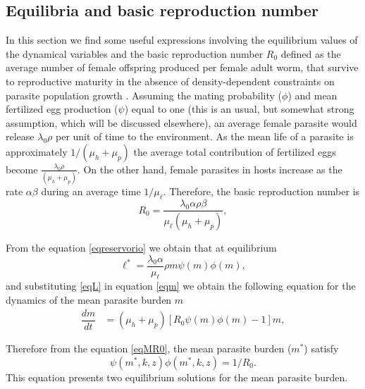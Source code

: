 \documentclass[eng]{MMSB-class-eng}
\begin{document}
{\subsection{Equilibria and basic reproduction number}



{\color{red}
In this section we find some useful expressions involving the equilibrium values of the dynamical variables and the basic reproduction number $R_0$ defined as 
the average number of female offspring produced per female adult worm, that survive to reproductive maturity in the
absence of density-dependent constraints on parasite population growth \citep{anderson1992infectious}. Assuming the mating probability ($\phi$) and mean fertilized egg production ($\psi$) equal to one (this is an usual, but somewhat strong assumption, which will be discussed elsewhere), an average female parasite would release $ \lambda_0  \rho$ per unit of time to the environment. As the mean life of a parasite is approximately $1/(\mu_h+\mu_p)$ the average total contribution of fertilized eggs become $\frac{\lambda_0  \rho}{ (\mu_h + \mu_p)}$. On the other hand, female parasites in hosts increase as the rate $\alpha\beta$ during an average time $1/\mu_{\ell}$. Therefore, the basic reproduction number is \citep{anderson1992infectious,truscott2014modeling,truscott2016soil}
\color{red}
\begin{equation}\label{valorR0}
R_0=\frac{ \lambda_0 \alpha  \rho \beta }{\mu_{\ell} (\mu_h + \mu_p) },
\end{equation}
}

From the equation \eqref{eqreservorio} we obtain that at equilibrium
\begin{equation}\label{eqL}
\ell^*=\frac{ \lambda_0 \alpha}{\mu_{\ell}} \rho  m \psi(m)\phi(m), 
\end{equation} 
and substituting \eqref{eqL} in equation \eqref{eqm} we obtain the following equation for the dynamics of the mean parasite burden $m$
\begin{align}\label{eqMR0}
\dfrac{dm}{dt}&=(\mu_h + \mu_p)\left[ R_0  \psi(m)\phi(m) -1 \right] m,%
\end{align}


Therefore from the equation \eqref{eqMR0}, the mean parasite burden ($m^*$) satisfy
\begin{equation}\label{eqequilibrio}
\psi(m^*,k,z)\phi(m^*,k,z)=1/R_0.
\end{equation}
This equation presents two  equilibrium solutions for the mean parasite burden. 

}
\end{document}
